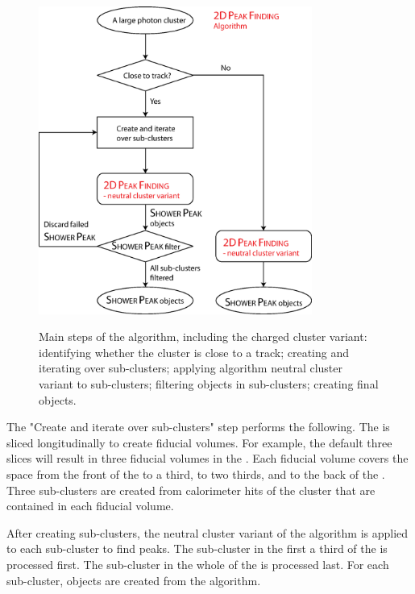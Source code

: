 \begin{figure}[tbph]
\centering
{\includegraphics[width=0.8\textwidth]{photon/2DpeakFindingTrack}}
\caption[Flow chart for \peakFinding algorithm.]
{Main steps of the  \peakFinding algorithm, including the charged cluster variant: identifying whether the cluster is close to a track; creating and iterating over sub-clusters; applying \peakFinding algorithm neutral cluster variant to sub-clusters; filtering \ShowerPeak objects in sub-clusters; creating final \ShowerPeak objects.}
\label{fig:photonPeakFindingFlow}
\end{figure}


The "Create and iterate over sub-clusters" step performs the following. The \ECAL is sliced longitudinally to create fiducial volumes. For example, the default three slices will result in three  fiducial volumes in the \ECAL. Each fiducial volume covers the  space from the front of the \ECAL to a third, to two thirds, and to the back of the \ECAL. Three sub-clusters are created from calorimeter hits of the cluster that are contained in each fiducial volume.

After creating sub-clusters, the neutral cluster variant of the  \peakFinding algorithm is applied to each sub-cluster to find peaks.  The sub-cluster in the first a third of the \ECAL is processed first. The sub-cluster in the whole of the \ECAL is processed last. For each sub-cluster,  \ShowerPeak objects are created from the  \peakFinding algorithm.

